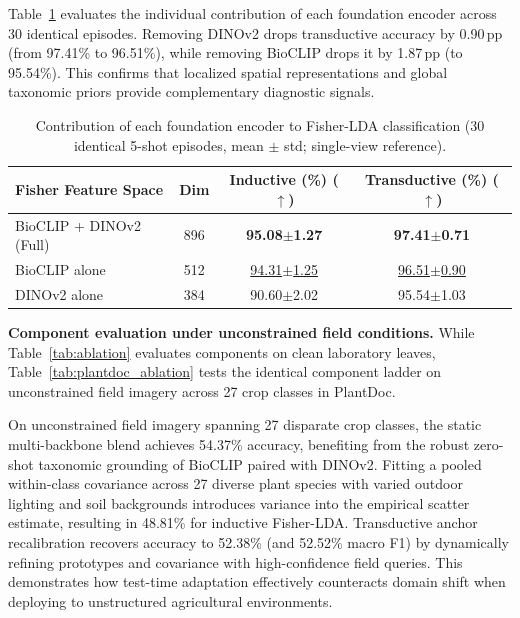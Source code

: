 Table~\ref{tab:feature_ablation} evaluates the individual contribution of each foundation encoder across 30 identical episodes. Removing DINOv2 drops transductive accuracy by 0.90\,pp (from 97.41\% to 96.51\%), while removing BioCLIP drops it by 1.87\,pp (to 95.54\%). This confirms that localized spatial representations and global taxonomic priors provide complementary diagnostic signals.

\begin{table}[htbp]
\caption{Contribution of each foundation encoder to Fisher-LDA classification (30 identical 5-shot episodes, mean $\pm$ std; single-view reference).}
\label{tab:feature_ablation}
\centering

\footnotesize
\setlength{\tabcolsep}{4pt}
\begin{tabular*}{\columnwidth}{@{\extracolsep{\fill}}lccc}
\toprule
\textbf{Fisher Feature Space} & \textbf{Dim} & \textbf{Inductive (\%) ($\uparrow$)} & \textbf{Transductive (\%) ($\uparrow$)} \\
\midrule
BioCLIP + DINOv2 (Full) & 896 & \textbf{95.08$\pm$1.27} & \textbf{97.41$\pm$0.71} \\
BioCLIP alone & 512 & \underline{94.31$\pm$1.25} & \underline{96.51$\pm$0.90} \\
DINOv2 alone & 384 & 90.60$\pm$2.02 & 95.54$\pm$1.03 \\
\bottomrule
\end{tabular*}
\end{table}

\textbf{Component evaluation under unconstrained field conditions.} While Table~\ref{tab:ablation} evaluates components on clean laboratory leaves, Table~\ref{tab:plantdoc_ablation} tests the identical component ladder on unconstrained field imagery across 27 crop classes in PlantDoc.

On unconstrained field imagery spanning 27 disparate crop classes, the static multi-backbone blend achieves 54.37\% accuracy, benefiting from the robust zero-shot taxonomic grounding of BioCLIP paired with DINOv2. Fitting a pooled within-class covariance across 27 diverse plant species with varied outdoor lighting and soil backgrounds introduces variance into the empirical scatter estimate, resulting in 48.81\% for inductive Fisher-LDA. Transductive anchor recalibration recovers accuracy to 52.38\% (and 52.52\% macro F1) by dynamically refining prototypes and covariance with high-confidence field queries. This demonstrates how test-time adaptation effectively counteracts domain shift when deploying to unstructured agricultural environments.

